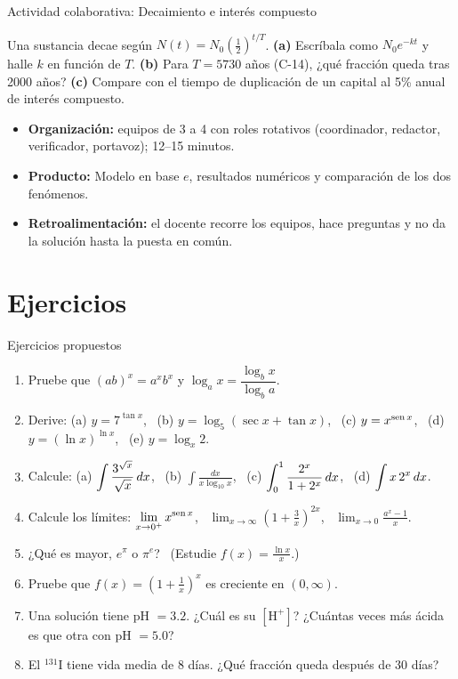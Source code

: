 \documentclass[10pt,aspectratio=169]{beamer}
\begin{document}
\begin{frame}{Actividad colaborativa: Decaimiento e interés compuesto}
  \small
  \begin{activa}
    Una sustancia decae según $N(t)=N_0\left(\tfrac12\right)^{t/T}$. \textbf{(a)} Escríbala como $N_0e^{-kt}$ y halle $k$ en función de $T$. \textbf{(b)} Para $T=5730$ años (C-14), ¿qué fracción queda tras 2000 años? \textbf{(c)} Compare con el tiempo de duplicación de un capital al 5\% anual de interés compuesto.
  \end{activa}
  \begin{itemize}
    \item \textbf{Organización:} equipos de 3 a 4 con roles rotativos (coordinador, redactor, verificador, portavoz); 12--15 minutos.
    \item \textbf{Producto:} Modelo en base $e$, resultados numéricos y comparación de los dos fenómenos.
    \item \textbf{Retroalimentación:} el docente recorre los equipos, hace preguntas y no da la solución hasta la puesta en común.
  \end{itemize}
\end{frame}

\section{Ejercicios}

\begin{frame}{Ejercicios propuestos}
  \begin{ejercicio}
    \begin{enumerate}
      \item Pruebe que $(ab)^x=a^xb^x$ y $\log_a x=\dfrac{\log_bx}{\log_ba}$.
      \item Derive: (a) $y=7^{\tan x}$, \ (b) $y=\log_5(\sec x+\tan x)$, \ (c) $y=x^{\operatorname{sen} x}$, \ (d) $y=(\ln x)^{\ln x}$,
        \ (e) $y=\log_x2$.
      \item Calcule: (a) $\displaystyle\int\frac{3^{\sqrt x}}{\sqrt x}\,dx$, \ (b) $\displaystyle\int\frac{dx}{x\log_{10}x}$,
        \ (c) $\displaystyle\int_0^1\frac{2^x}{1+2^x}\,dx$, \ (d) $\displaystyle\int x\,2^x\,dx$.
      \item Calcule los límites: $\displaystyle\lim_{x\to0^+}x^{\operatorname{sen} x}$, \ $\displaystyle\lim_{x\to\infty}\left(1+\frac{3}{x}\right)^{2x}$,
        \ $\displaystyle\lim_{x\to0}\frac{a^x-1}{x}$.
      \item ¿Qué es mayor, $e^\pi$ o $\pi^e$? \ \small(Estudie $f(x)=\frac{\ln x}{x}$.)
      \item Pruebe que $f(x)=\left(1+\frac1x\right)^x$ es creciente en $(0,\infty)$.
      \item Una solución tiene pH $=3.2$. ¿Cuál es su $[\mathrm{H^+}]$? ¿Cuántas veces más ácida es que otra con pH $=5.0$?
      \item El $^{131}$I tiene vida media de 8 días. ¿Qué fracción queda después de 30 días?
    \end{enumerate}
  \end{ejercicio}
\end{frame}
\end{document}
